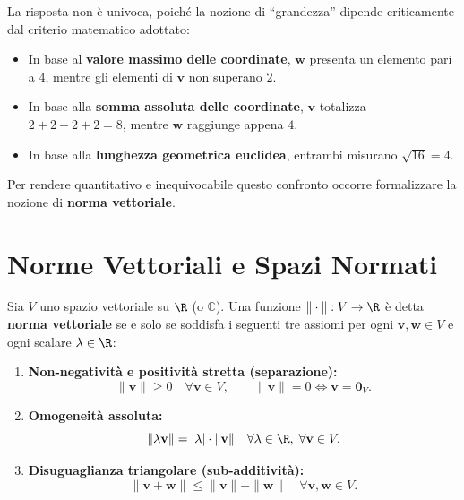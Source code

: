 La risposta non è univoca, poiché la nozione di ``grandezza'' dipende criticamente dal criterio matematico adottato:
\begin{itemize}
    \item In base al \textbf{valore massimo delle coordinate}, $\mathbf{w}$ presenta un elemento pari a $4$, mentre gli elementi di $\mathbf{v}$ non superano $2$.
    \item In base alla \textbf{somma assoluta delle coordinate}, $\mathbf{v}$ totalizza $2 + 2 + 2 + 2 = 8$, mentre $\mathbf{w}$ raggiunge appena $4$.
    \item In base alla \textbf{lunghezza geometrica euclidea}, entrambi misurano $\sqrt{16} = 4$.
\end{itemize}

Per rendere quantitativo e inequivocabile questo confronto occorre formalizzare la nozione di \textbf{norma vettoriale}.

\FloatBarrier
\section{Norme Vettoriali e Spazi Normati}

\begin{definition}
Sia $V$ uno spazio vettoriale su $\R$ (o $\mathbb{C}$). Una funzione $\|\cdot\|: V \to \R$ è detta \textbf{norma vettoriale} se e solo se soddisfa i seguenti tre assiomi per ogni $\mathbf{v}, \mathbf{w} \in V$ e ogni scalare $\lambda \in \R$:
\begin{enumerate}
    \item \textbf{Non-negatività e positività stretta (separazione):}
    \begin{equation}
        \|\mathbf{v}\| \ge 0 \quad \forall \mathbf{v} \in V, \qquad \|\mathbf{v}\| = 0 \iff \mathbf{v} = \mathbf{0}_V.
    \end{equation}
    \item \textbf{Omogeneità assoluta:}
    \begin{equation}
        \|\lambda \mathbf{v}\| = |\lambda| \cdot \|\mathbf{v}\| \quad \forall \lambda \in \R, \; \forall \mathbf{v} \in V.
    \end{equation}
    \item \textbf{Disuguaglianza triangolare (sub-additività):}
    \begin{equation}
        \|\mathbf{v} + \mathbf{w}\| \le \|\mathbf{v}\| + \|\mathbf{w}\| \quad \forall \mathbf{v}, \mathbf{w} \in V.
    \end{equation}
\end{enumerate}
\end{definition}

